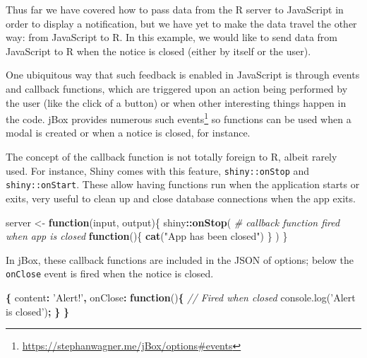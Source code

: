 \documentclass[10pt,]{krantz}
\makeatletter
\newenvironment{Shaded}{\begin{snugshade}}{\end{snugshade}}
\newcommand{\AttributeTok}[1]{\textcolor[rgb]{0.61,0.61,0.61}{#1}}
\newcommand{\CommentTok}[1]{\textcolor[rgb]{0.37,0.37,0.37}{\textit{#1}}}
\newcommand{\ControlFlowTok}[1]{\textcolor[rgb]{0.27,0.27,0.27}{\textbf{#1}}}
\newcommand{\DataTypeTok}[1]{\textcolor[rgb]{0.27,0.27,0.27}{#1}}
\newcommand{\KeywordTok}[1]{\textcolor[rgb]{0.27,0.27,0.27}{\textbf{#1}}}
\newcommand{\NormalTok}[1]{#1}
\newcommand{\OperatorTok}[1]{\textcolor[rgb]{0.43,0.43,0.43}{\textbf{#1}}}
\newcommand{\StringTok}[1]{\textcolor[rgb]{0.5,0.5,0.5}{#1}}
\newcommand{\VariableTok}[1]{\textcolor[rgb]{0,0,0}{#1}}
\renewcommand{\href}[2]{#2\footnote{\url{#1}}}
\newenvironment{kframe}{%
\medskip{}
\setlength{\fboxsep}{.8em}
 \def\at@end@of@kframe{}%
 \ifinner\ifhmode%
  \def\at@end@of@kframe{\end{minipage}}%
  \begin{minipage}{\columnwidth}%
 \fi\fi%
 \def\FrameCommand##1{\hskip\@totalleftmargin \hskip-\fboxsep
 \colorbox{shadecolor}{##1}\hskip-\fboxsep
     \hskip-\linewidth \hskip-\@totalleftmargin \hskip\columnwidth}%
 \MakeFramed {\advance\hsize-\width
   \@totalleftmargin\z@ \linewidth\hsize
   \@setminipage}}%
 {\par\unskip\endMakeFramed%
 \at@end@of@kframe}
\renewenvironment{Shaded}{\begin{kframe}}{\end{kframe}}
\makeatother
\begin{document}
Thus far we have covered how to pass data from the R server to JavaScript in order to display a notification, but we have yet to make the data travel the other way: from JavaScript to R. In this example, we would like to send data from JavaScript to R when the notice is closed (either by itself or the user).

One ubiquitous way that such feedback is enabled in JavaScript is through events and callback functions, which are triggered upon an action being performed by the user (like the click of a button) or when other interesting things happen in the code. jBox provides numerous such \href{https://stephanwagner.me/jBox/options\#events}{events} so functions can be used when a modal is created or when a notice is closed, for instance.

The concept of the callback function is not totally foreign to R, albeit rarely used. For instance, Shiny comes with this feature, \texttt{shiny::onStop} and \texttt{shiny::onStart}. These allow having functions run when the application starts or exits, very useful to clean up and close database connections when the app exits.

\begin{Shaded}
\begin{Highlighting}[]
\NormalTok{server <-}\StringTok{ }\ControlFlowTok{function}\NormalTok{(input, output)\{}
\NormalTok{  shiny}\OperatorTok{::}\KeywordTok{onStop}\NormalTok{(}
    \CommentTok{# callback function fired when app is closed}
    \ControlFlowTok{function}\NormalTok{()\{}
      \KeywordTok{cat}\NormalTok{(}\StringTok{"App has been closed"}\NormalTok{)}
\NormalTok{    \}}
\NormalTok{  )}
\NormalTok{\}}
\end{Highlighting}
\end{Shaded}

In jBox, these callback functions are included in the JSON of options; below the \texttt{onClose} event is fired when the notice is closed.

\begin{Shaded}
\begin{Highlighting}[]
\OperatorTok{\{}
  \DataTypeTok{content}\OperatorTok{:} \StringTok{'Alert!'}\OperatorTok{,}
  \DataTypeTok{onClose}\OperatorTok{:} \KeywordTok{function}\NormalTok{()}\OperatorTok{\{}
    \CommentTok{// Fired when closed }
    \VariableTok{console}\NormalTok{.}\AttributeTok{log}\NormalTok{(}\StringTok{'Alert is closed'}\NormalTok{)}\OperatorTok{;}
  \OperatorTok{\}}
\OperatorTok{\}}
\end{Highlighting}
\end{Shaded}
\end{document}
